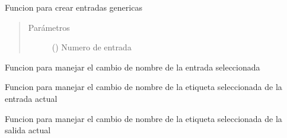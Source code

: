 \documentclass[letterpaper,10pt,spanish]{sphinxmanual}
\begin{document}
\begin{fulllineitems}
\label{\detokenize{codigos/FuzzyHandler:FuzzyHandler.inputDic_creator}}
Funcion para crear entradas genericas
\begin{quote}\begin{description}
\item[{Parámetros}] \leavevmode
{} () \textendash{} Numero de entrada

\end{description}\end{quote}

\end{fulllineitems}


\begin{fulllineitems}
\label{\detokenize{codigos/FuzzyHandler:FuzzyHandler.nombre_entrada}}
Funcion para manejar el cambio de nombre de la entrada seleccionada

\end{fulllineitems}


\begin{fulllineitems}
\label{\detokenize{codigos/FuzzyHandler:FuzzyHandler.nombre_etiqueta_in}}
Funcion para manejar el cambio de nombre de la etiqueta seleccionada de la entrada actual

\end{fulllineitems}


\begin{fulllineitems}
\label{\detokenize{codigos/FuzzyHandler:FuzzyHandler.nombre_etiqueta_out}}
Funcion para manejar el cambio de nombre de la etiqueta seleccionada de la salida actual

\end{fulllineitems}
\end{document}
